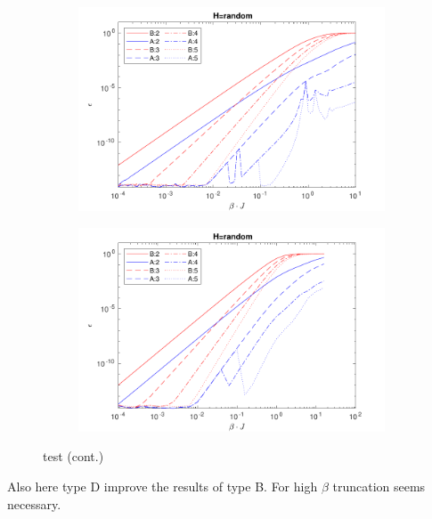 \begin{figure}[H]\ContinuedFloat
    \begin{subfigure}[]{\textwidth}
        \includegraphics[width=\textwidth]{Figuren/benchmarking/rand_03.pdf}
    \end{subfigure}

    \begin{subfigure}[]{\textwidth}
        \includegraphics[width=\textwidth]{Figuren/benchmarking/rand_04.pdf}
    \end{subfigure}
    \caption{test (cont.) }
    \label{fig:benchmark:Random}
\end{figure}

Also here type D improve the results of type B. For high $\beta$ truncation seems necessary. 

